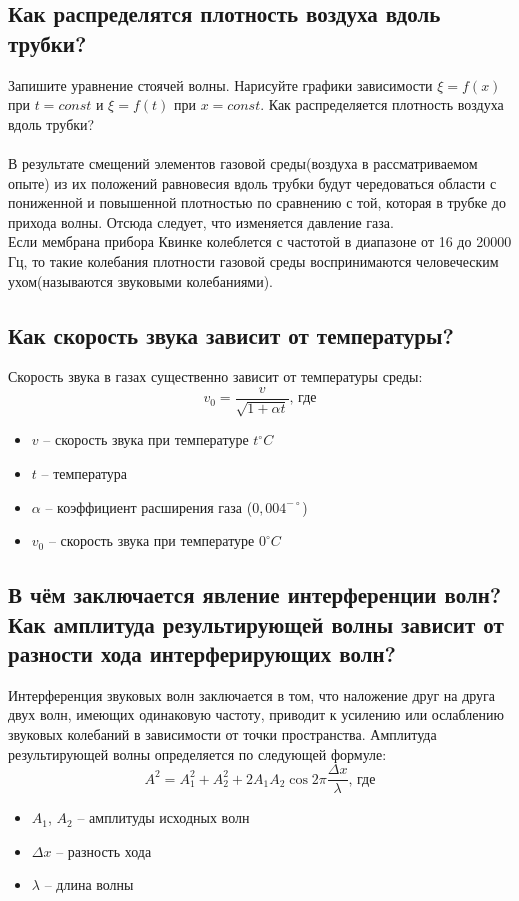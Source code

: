 \documentclass[otchet]{SCWorks}
\begin{document}
\subsection{Как распределятся плотность воздуха вдоль трубки?}
Запишите уравнение стоячей волны. Нарисуйте графики зависимости $\xi=f(x)$ при $t=const$ и $\xi=f(t)$ при $x = const$. Как распределяется плотность воздуха вдоль трубки? \\
\\
В результате смещений элементов газовой среды(воздуха в рассматриваемом опыте) из их положений равновесия вдоль трубки будут чередоваться области с пониженной и повышенной плотностью по сравнению с той, которая в трубке до прихода волны. Отсюда следует, что изменяется давление газа. \\
Если мембрана прибора Квинке колеблется с частотой в диапазоне от 16 до 20000 Гц, то такие колебания плотности газовой среды воспринимаются человеческим ухом(называются звуковыми колебаниями).
\subsection{Как скорость звука зависит от температуры?}
Скорость звука в газах существенно зависит от температуры среды:
\begin{equation*}
    v_0 = \frac{v}{\sqrt{1 + \alpha t}}\text{, где}
\end{equation*}
\begin{itemize}
    \item $v$ -- скорость звука при температуре $t^\circ C$
    \item $t$ -- температура
    \item $\alpha$ -- коэффициент расширения газа ($0,004^{-\circ}$)
    \item $v_0$ -- скорость звука при температуре $0^\circ C$
\end{itemize}

\subsection{В чём заключается явление интерференции волн? Как амплитуда результирующей волны зависит от разности хода интерферирующих волн?}
Интерференция звуковых волн заключается в том, что наложение друг на друга двух волн, имеющих одинаковую частоту, приводит к усилению или ослаблению звуковых колебаний в зависимости от точки пространства. Амплитуда результирующей волны определяется по следующей формуле:
\begin{equation*}
    A^2 = A^2_1 + A^2_2 + 2A_1A_2\cos{2\pi\frac{\Delta x}{\lambda}}\text{, где}
\end{equation*}
\begin{itemize}
    \item $A_1$, $A_2$ -- амплитуды исходных волн
    \item $\Delta x$ -- разность хода
    \item $\lambda$ -- длина волны
\end{itemize}
\end{document}
